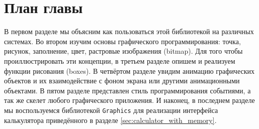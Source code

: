 \section{План главы}
\label{sec:chapter_overview_5}

В первом разделе мы объясним как пользоваться этой библиотекой на различных
системах. Во втором изучим основы графического программирования: точка, рисунок,
заполнение, цвет, растровые изображения (bitmap). Для того чтобы 
проиллюстрировать эти концепции, в третьем разделе опишем и реализуем функции 
рисования  (boxes). В четвёртом разделе увидим анимацию графических 
объектов и их взаимодействие с фоном экрана или другими анимационными объектами. 
В пятом разделе представлен стиль программирования событиями, а так же скелет 
любого графического приложения. И наконец, в последнем разделе мы воспользуемся 
библиотекой \texttt{Graphics} для реализации интерфейса калькулятора 
приведённого в разделе \ref{sec:calculator_with_memory}.